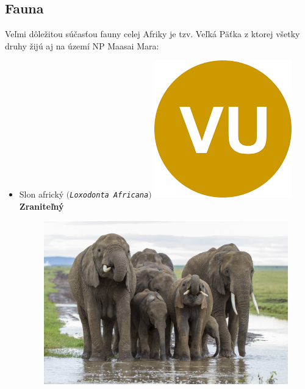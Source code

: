 \documentclass{article}
\begin{document}
\subsection{Fauna}
Veľmi dôležitou súčasťou fauny celej Afriky je tzv. Veľká Päťka z ktorej všetky druhy žijú aj na území NP Maasai Mara:
\begin{flushright}
\begin{itemize}
\item Slon africký $($\texttt{\textit{Loxodonta Africana}}$)$ \includegraphics[scale=0.09]{VU.png}{\color{Dandelion} \textbf{Zraniteľný}}
\begin{figure}[h]
\includegraphics[scale=0.8]{Slony-masai.jpg}

\end{figure}




\end{itemize}
\end{flushright}
\end{document}
